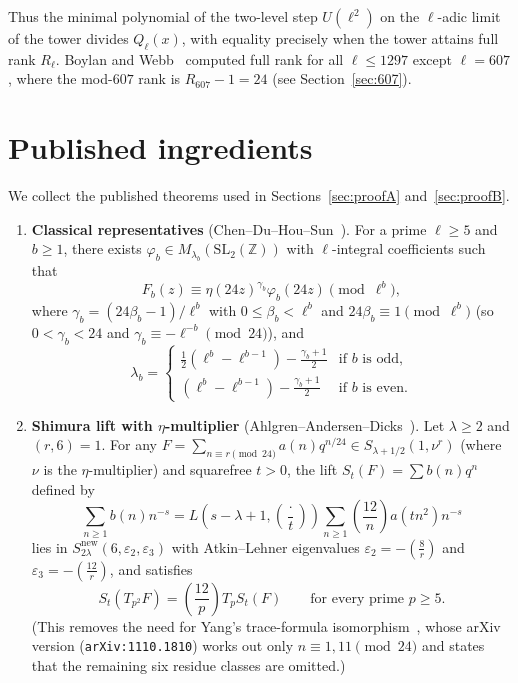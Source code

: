 \documentclass[11pt,reqno]{amsart}
\theoremstyle{definition}
\theoremstyle{remark}
\newcommand{\Z}{\mathbb{Z}}
\newcommand{\legendre}[2]{\left(\frac{#1}{#2}\right)}
\newcommand{\SL}{\mathrm{SL}}
\newcommand{\new}{\mathrm{new}}
\begin{document}
Thus the minimal polynomial of the two-level step $U(\ell^2)$ on the $\ell$-adic limit of the tower divides $Q_\ell(x)$, with equality precisely when the tower attains full rank $R_\ell$. Boylan and Webb~\cite{BW} computed full rank for all $\ell \le 1297$ except $\ell = 607$, where the mod-$607$ rank is $R_{607} - 1 = 24$ (see Section~\ref{sec:607}).

\section{Published ingredients}\label{sec:ingredients}

We collect the published theorems used in Sections~\ref{sec:proofA} and~\ref{sec:proofB}.

\begin{enumerate}
  \item[\textbf{(I1)}] \textbf{Classical representatives} (Chen--Du--Hou--Sun~\cite[Thm.~3.1]{CDHS}). For a prime $\ell \ge 5$ and $b \ge 1$, there exists $\varphi_b \in M_{\lambda_b}(\SL_2(\Z))$ with $\ell$-integral coefficients such that
  \[
    F_b(z) \equiv \eta(24z)^{\gamma_b} \varphi_b(24z) \pmod{\ell^b},
  \]
  where $\gamma_b = (24\beta_b - 1)/\ell^b$ with $0 \le \beta_b < \ell^b$ and $24\beta_b \equiv 1 \pmod{\ell^b}$ (so $0 < \gamma_b < 24$ and $\gamma_b \equiv -\ell^{-b} \pmod{24}$), and
  \[
    \lambda_b = \begin{cases}
      \frac{1}{2}(\ell^b - \ell^{b-1}) - \frac{\gamma_b + 1}{2} & \text{if $b$ is odd,}\\[4pt]
      (\ell^b - \ell^{b-1}) - \frac{\gamma_b + 1}{2} & \text{if $b$ is even.}
    \end{cases}
  \]

  \item[\textbf{(I2)}] \textbf{Shimura lift with $\eta$-multiplier} (Ahlgren--Andersen--Dicks~\cite[Thm.~1.1]{AAD}). Let $\lambda \ge 2$ and $(r,6)=1$. For any $F = \sum_{n \equiv r \pmod{24}} a(n) q^{n/24} \in S_{\lambda+1/2}(1, \nu^r)$ (where $\nu$ is the $\eta$-multiplier) and squarefree $t > 0$, the lift $S_t(F) = \sum b(n) q^n$ defined by
  \[
    \sum_{n \ge 1} b(n) n^{-s} = L\!\left(s - \lambda + 1, \legendre{\cdot}{t}\right) \sum_{n \ge 1} \legendre{12}{n} a(tn^2) n^{-s}
  \]
  lies in $S_{2\lambda}^{\new}(6, \varepsilon_2, \varepsilon_3)$ with Atkin--Lehner eigenvalues $\varepsilon_2 = -\legendre{8}{r}$ and $\varepsilon_3 = -\legendre{12}{r}$, and satisfies
  \[
    S_t(T_{p^2} F) = \legendre{12}{p} T_p S_t(F) \qquad \text{for every prime } p \ge 5.
  \]
  (This removes the need for Yang's trace-formula isomorphism~\cite{Y14}, whose arXiv version (\texttt{arXiv:1110.1810}) works out only $n \equiv 1, 11 \pmod{24}$ and states that the remaining six residue classes are omitted.)


\end{enumerate}
\end{document}

